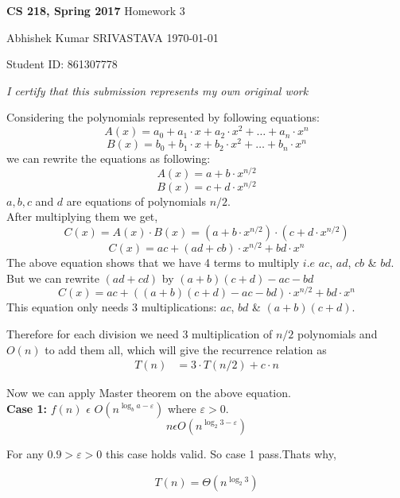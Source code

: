 \documentclass[a4paper,11pt]{article}
\renewcommand{\maketitle}{%
	
	\Large
 	\textbf{CS 218, Spring 2017}
 	\hfill
 	Homework 3
 	\par
 	
	\Large
	Abhishek Kumar SRIVASTAVA
	\hfill
	\normalsize
	\today
 	\par
 	Student ID: 861307778
 	\par
 	
 	\begin{center}

 	\vspace{.2in}
 	
 	\textit{I certify that this submission represents my own original work }
 	\par
	\vspace{.2in}
	\makebox[3.0in]{\hrulefill}
	\par

 	\end{center}
 	
 	\hrulefill
 	\par \vspace{2ex}
 	}
\theoremstyle{quest}
\newenvironment{solution}[2][Solution]{\begin{trivlist}
		\item[\hskip \labelsep {\bfseries #1}\hskip \labelsep {\bfseries #2.}]}{\end{trivlist}}
\begin{document}
\thispagestyle{empty}
	
\maketitle

\begin{solution}1	
	Considering the polynomials represented by following equations:
	\begin{equation*}
	A(x) = a_0 + a_1\cdot x + a_2\cdot x^2 + \dots + a_{n}\cdot x^{n}
	\end{equation*}
	\begin{equation*}
	B(x) = b_0 + b_1\cdot x + b_2\cdot x^2 + \dots + b_{n}\cdot x^{n}
	\end{equation*}
	we can rewrite the equations as following:
	\begin{equation*}
	A(x) = a + b\cdot x^{n/2} 
	\end{equation*} 
	\begin{equation*}
	B(x) = c + d\cdot x^{n/2}
	\end{equation*}
	$a,b,c$ and $d$ are equations of polynomials $n/2$.\\
	After multiplying them we get,
	\begin{equation*}
	C(x) = A(x)\cdot B(x) = (a + b\cdot x^{n/2}) \cdot (c + d\cdot x^{n/2}) 
	\end{equation*}
	\begin{equation*}
	C(x) = ac + (ad + cb )\cdot x^{n/2} + bd \cdot x^{n}
	\end{equation*}
	The above equation shows that we have 4 terms to multiply $i.e$  $ac$, $ad$, $cb$ \& $bd$. But we can rewrite $(ad + cd)$ by $(a+b)(c+d) - ac - bd$
	\begin{equation*}
	C(x) = ac + ((a+b)(c+d) - ac - bd)\cdot x^{n/2} + bd \cdot x^{n}
	\end{equation*}
	This equation only needs 3 multiplications: $ac$, $bd$ \& $(a+b)(c+d)$. 
	
	Therefore for each division we need 3 multiplication of $n/2$ polynomials and $O(n)$ to add them all, which will give the recurrence relation as 
	\begin{align*}
	T(n)&= 3 \cdot T(n/2) + c\cdot n
	\end{align*}
	
	Now we can apply Master theorem on the above equation.\\

	\textbf{Case 1:} $f(n)$ $\epsilon$ $O(n^{\log_b{a} - \varepsilon})$ where $\varepsilon > 0$.\\
	\begin{equation*}
	n \epsilon O(n^{\log_2{3} - \varepsilon})
	\end{equation*}
	
	For any $0.9 > \varepsilon > 0$ this case holds valid. So case 1 pass.Thats why,

	\begin{align*}
	\boxed{T(n) = \Theta(n^{\log_2{3}})}
	\end{align*}
\end{solution}
\end{document}
